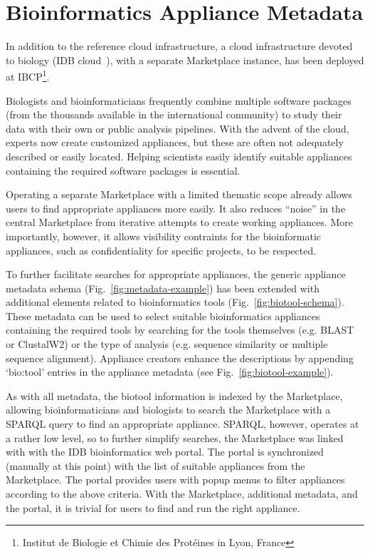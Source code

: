 \section{Bioinformatics Appliance Metadata}
\label{sec:bioinfo}

In addition to the reference cloud infrastructure, a cloud
infrastructure devoted to biology (IDB cloud~\cite{idbcloud}), with a
separate Marketplace instance, has been deployed at
IBCP\footnote{Institut de Biologie et Chimie des Prot\'eines in Lyon,
  France}.

Biologists and bioinformaticians frequently combine multiple software
packages (from the thousands available in the international community)
to study their data with their own or public analysis pipelines. With
the advent of the cloud, experts now create customized appliances, but
these are often not adequately described or easily located.  Helping
scientists easily identify suitable appliances containing the required
software packages is essential.

Operating a separate Marketplace with a limited thematic scope already
allows users to find appropriate appliances more easily.  It also
reduces ``noise'' in the central Marketplace from iterative attempts
to create working appliances.  More importantly, however, it allows
visibility contraints for the bioinformatic appliances, such as
confidentiality for specific projects, to be respected.

To further facilitate searches for appropriate appliances,
the generic appliance metadata schema 
(Fig.~\ref{fig:metadata-example}) has been extended with additional elements related to
bioinformatics tools (Fig.~\ref{fig:biotool-schema})\@. These metadata
can be used to select suitable bioinformatics appliances containing
the required tools by searching for the tools themselves (e.g. BLAST or
ClustalW2) or the type of analysis (e.g. sequence similarity or
multiple sequence alignment).  Appliance creators enhance the
descriptions by appending `bio:tool' entries in the appliance metadata
(see Fig.~\ref{fig:biotool-example}).

As with all metadata, the biotool information is indexed by the
Marketplace, allowing bioinformaticians and biologists to search the
Marketplace with a SPARQL query to find an appropriate appliance.
SPARQL, however, operates at a rather low level, so to further
simplify searches, the Marketplace was linked with with the IDB
bioinformatics web portal.  The portal is synchronized (manually at
this point) with the list of suitable appliances from the Marketplace\@. The
portal provides users with popup menus to filter appliances according
to the above criteria.  With the Marketplace, additional metadata, and
the portal, it is trivial for users to find and run the right
appliance.

